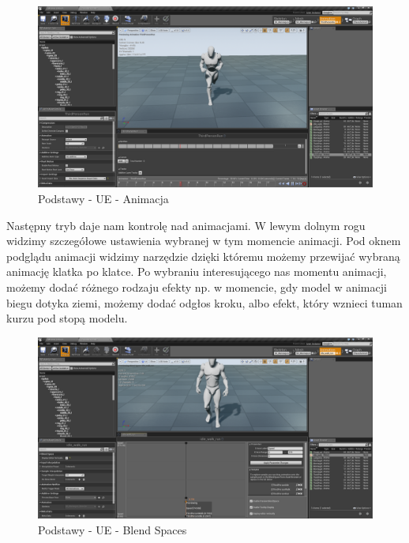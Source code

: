 \documentclass[12pt]{xmgr}
\begin{document}
\newpage
\begin{figure}[!htb]
    \begin{center}
    \includegraphics[scale=0.25]{Screeny/Animation}
    \end{center}
    \caption{Podstawy - UE - Animacja}
\end{figure}

Następny tryb daje nam kontrolę nad animacjami. W lewym dolnym rogu widzimy szczegółowe ustawienia wybranej w tym momencie animacji.
Pod oknem podglądu animacji widzimy narzędzie dzięki któremu możemy przewijać wybraną animację klatka po klatce. Po wybraniu interesującego nas momentu animacji, możemy dodać różnego rodzaju efekty np. w momencie, gdy model w animacji biegu dotyka ziemi, możemy dodać odgłos kroku, albo efekt, który wznieci tuman kurzu pod stopą modelu.

\newpage
\begin{figure}[!htb]
    \begin{center}
    \includegraphics[scale=0.25]{Screeny/Blend_Space}
    \end{center}
    \caption{Podstawy - UE - Blend Spaces}
\end{figure}
\end{document}
